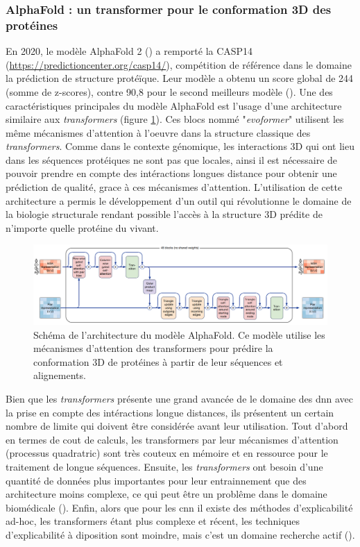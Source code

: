 \subsubsection{AlphaFold : un transformer pour le conformation 3D des protéines}
En 2020, le modèle AlphaFold 2 (\cite{jumper_highly_2021}) a remporté la CASP14 (\href{https://predictioncenter.org/casp14/}{https://predictioncenter.org/casp14/}), compétition de référence dans le domaine la prédiction de structure protéïque. Leur modèle a obtenu un score global de 244 (somme de z-scores), contre 90,8 pour le second meilleurs modèle (\cite{jumper_applying_2021}). Une des caractéristiques principales du modèle AlphaFold est l'usage d'une architecture similaire aux \textit{transformers} (figure \ref{fig:alphafold}). Ces blocs nommé "\textit{evoformer}" utilisent les même mécanismes d'attention à l'oeuvre dans la structure classique des \textit{transformers}. Comme dans le contexte génomique, les interactions 3D qui ont lieu dans les séquences protéiques ne sont pas que locales, ainsi il est nécessaire de pouvoir prendre en compte des intéractions longues distance pour obtenir une prédiction de qualité, grace à ces mécanismes d'attention. L'utilisation de cette architecture a permis le développement d'un outil qui révolutionne le domaine de la biologie structurale rendant possible l'accès à la structure 3D prédite de n'importe quelle protéine du vivant.
\begin{figure}[!htbp]
 \centering
 \includegraphics[width=1\textwidth]{figures/alphafold.png}
 \caption[Schéma de l'architecture du modèle AlphaFold]{Schéma de l'architecture du modèle AlphaFold. Ce modèle utilise les mécanismes d'attention des transformers pour prédire la conformation 3D de protéines à partir de leur séquences et alignements.}
 \label{fig:alphafold}
\end{figure}

Bien que les \textit{transformers} présente une grand avancée de le domaine des \gls{dnn} avec la prise en compte des intéractions longue distances, ils présentent un certain nombre de limite qui doivent être considérée avant leur utilisation. Tout d'abord en termes de cout de calculs, les transformers par leur mécanismes d'attention (processus quadratric) sont très couteux en mémoire et en ressource pour le traitement de longue séquences. Ensuite, les \textit{transformers} ont besoin d'une quantité de données plus importantes pour leur entrainnement que des architecture moins complexe, ce qui peut être un problême dans le domaine biomédicale (\cite{willemink_toward_2022}). Enfin, alors que pour les \gls{cnn} il existe des méthodes d'explicabilité ad-hoc, les transformers étant plus complexe et récent, les techniques d'explicabilité à diposition sont moindre, mais c'est un domaine recherche actif (\cite{kim_can_2022, saha_explainability_2022}). 

